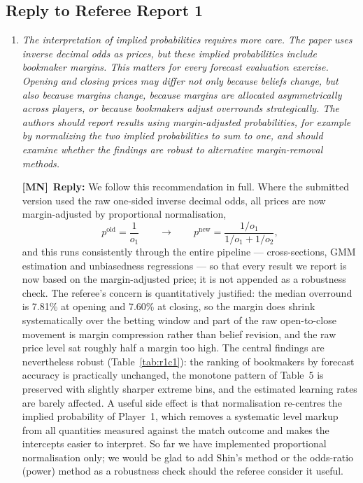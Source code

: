 \documentclass[letterpaper,12pt]{article}
\newcounter{b}
\newcommand{\ReplyMN}[1]{\par\noindent%
  \textcolor{mncol}{\textbf{[MN]}}~\textbf{Reply:} #1}
\begin{document}
\subsection*{Reply to Referee Report 1}
\begin{enumerate}
\item \textit{ The interpretation of implied probabilities requires more care. The paper uses inverse
decimal odds as prices, but these implied probabilities include bookmaker margins.
This matters for every forecast evaluation exercise. Opening and closing prices may
differ not only because beliefs change, but also because margins change, because
margins are allocated asymmetrically across players, or because bookmakers adjust
overrounds strategically. The authors should report results using margin-adjusted
probabilities, for example by normalizing the two implied probabilities to sum to one, and should examine whether the findings are robust to alternative margin-removal
methods.}

\ReplyMN{We follow this recommendation in full. Where the submitted version used the raw one-sided inverse decimal odds, all prices are now margin-adjusted by proportional normalisation,
\begin{equation*}
p^{\text{old}} = \frac{1}{o_1}
\qquad \longrightarrow \qquad
p^{\text{new}} = \frac{1/o_1}{1/o_1 + 1/o_2},
\end{equation*}
and this runs consistently through the entire pipeline --- cross-sections, GMM estimation and unbiasedness regressions --- so that every result we report is now based on the margin-adjusted price; it is not appended as a robustness check. The referee's concern is quantitatively justified: the median overround is 7.81\% at opening and 7.60\% at closing, so the margin does shrink systematically over the betting window and part of the raw open-to-close movement is margin compression rather than belief revision, and the raw price level sat roughly half a margin too high. The central findings are nevertheless robust (Table~\ref{tab:r1c1}): the ranking of bookmakers by forecast accuracy is practically unchanged, the monotone pattern of Table~5 is preserved with slightly sharper extreme bins, and the estimated learning rates are barely affected. A useful side effect is that normalisation re-centres the implied probability of Player~1, which removes a systematic level markup from all quantities measured against the match outcome and makes the intercepts easier to interpret. So far we have implemented proportional normalisation only; we would be glad to add Shin's method or the odds-ratio (power) method as a robustness check should the referee consider it useful.

}
\end{enumerate}
\end{document}
